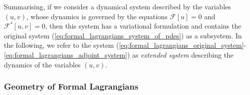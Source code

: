 \documentclass[12pt,a4paper,reqno]{article}
\begin{document}
Summarising, if we consider a dynamical system described by the variables $({\ensuremath{{\ensuremath{{u}}}}}, {\ensuremath{{\ensuremath{{v}}}}})$, whose dynamics is governed by the equations $\mathcal{F} [{\ensuremath{{\ensuremath{{u}}}}}] = 0$ and $\mathcal{F}^{*} [{\ensuremath{{\ensuremath{{u}}}}}, {\ensuremath{{\ensuremath{{v}}}}}] = 0$, then this system has a variational formulation and contains the original system (\ref{eq:formal_lagrangians_system_of_pdes}) as a subsystem.
In the following, we refer to the system (\ref{eq:formal_lagrangians_original_system}-\ref{eq:formal_lagrangians_adjoint_system}) as \emph{extended system} describing the dynamics of the variables $({\ensuremath{{\ensuremath{{u}}}}}, {\ensuremath{{\ensuremath{{v}}}}})$.

\subsubsection*{Geometry of Formal Lagrangians}
\end{document}
